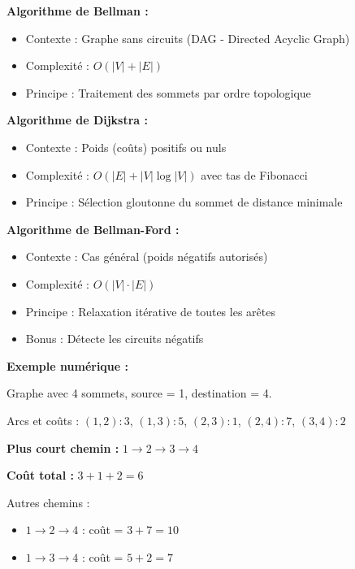 \documentclass[12pt,a4paper]{article}
\begin{document}
\begin{algorithme}
\textbf{Algorithme de Bellman :}
\begin{itemize}
    \item \textcolor{titrebleu}{Contexte :} Graphe sans circuits (DAG - Directed Acyclic Graph)
    \item \textcolor{defvert}{Complexité :} $O(|V| + |E|)$
    \item \textcolor{algoviolet}{Principe :} Traitement des sommets par ordre topologique
\end{itemize}

\textbf{Algorithme de Dijkstra :}
\begin{itemize}
    \item \textcolor{titrebleu}{Contexte :} Poids (coûts) positifs ou nuls
    \item \textcolor{defvert}{Complexité :} $O(|E| + |V| \log |V|)$ avec tas de Fibonacci
    \item \textcolor{algoviolet}{Principe :} Sélection gloutonne du sommet de distance minimale
\end{itemize}

\textbf{Algorithme de Bellman-Ford :}
\begin{itemize}
    \item \textcolor{titrebleu}{Contexte :} Cas général (poids négatifs autorisés)
    \item \textcolor{defvert}{Complexité :} $O(|V| \cdot |E|)$
    \item \textcolor{algoviolet}{Principe :} Relaxation itérative de toutes les arêtes
    \item \textcolor{importantrouge}{Bonus :} Détecte les circuits négatifs
\end{itemize}
\end{algorithme}

\begin{exemple}
\textbf{Exemple numérique :}

Graphe avec 4 sommets, source = 1, destination = 4.

Arcs et coûts : $(1,2): 3$, $(1,3): 5$, $(2,3): 1$, $(2,4): 7$, $(3,4): 2$

\textbf{Plus court chemin :} $1 \to 2 \to 3 \to 4$

\textbf{Coût total :} $3 + 1 + 2 = 6$

Autres chemins :
\begin{itemize}
    \item $1 \to 2 \to 4$ : coût = $3 + 7 = 10$
    \item $1 \to 3 \to 4$ : coût = $5 + 2 = 7$
\end{itemize}
\end{exemple}
\end{document}
